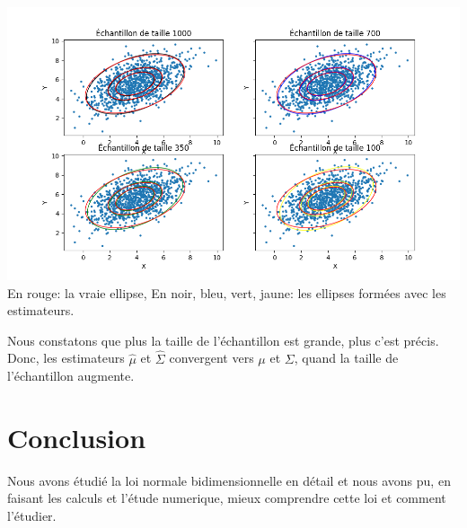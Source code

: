 \documentclass{article}
\begin{document}
\includegraphics[width=\textwidth]{Figure_2.png}
En rouge: la vraie ellipse, En noir, bleu, vert, jaune: les ellipses formées avec les estimateurs.

Nous constatons que plus la taille de l'échantillon est grande, plus c'est précis. Donc, les estimateurs $\hat{\mu}$ et $\hat{\Sigma}$ convergent vers $\mu$ et $\Sigma$, quand la taille de l'échantillon augmente.

\section{Conclusion}
Nous avons étudié la loi normale bidimensionnelle en détail et nous avons pu, en faisant les calculs et l'étude numerique, mieux comprendre cette loi et comment l'étudier.
\end{document}
